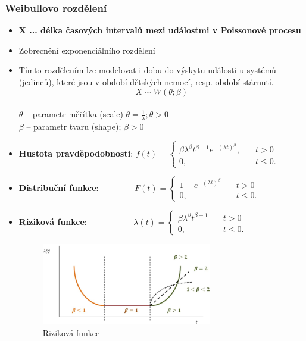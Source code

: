 \subsubsection{Weibullovo rozdělení}
\begin{itemize}
	\item \textbf{X ... délka časových intervalů mezi událostmi v Poissonově procesu}
	\item Zobrecnění exponenciálního rozdělení
	\item Tímto rozdělením lze modelovat i dobu do výskytu události u systémů (jedinců), které jsou v období dětských nemocí, resp. období stárnutí.
	$$X \sim W(\theta;\beta)$$
	\\ $\theta$ -- parametr měřítka (scale) $\theta = \frac{1}{\lambda}; \theta > 0$ \\ $\beta$ -- parametr tvaru (shape); $\beta > 0$
	\item \textbf{Hustota pravděpodobnosti}:
	 $f(t) =	\begin{cases}
 			   \beta\lambda^{\beta} t^{\beta-1}e^{-(\lambda t)^{\beta}},       & \quad t > 0\\
 			   0,  & \quad t \leq 0.
 			 \end{cases}$
	\item \textbf{Distribuční funkce}:
	$\qquad\qquad F(t) =	\begin{cases}
 			   1 -  e^{-(\lambda t)^{\beta} }      & \quad t > 0\\
 			   0,  & \quad t \leq 0.
 			 \end{cases}$
 	\item \textbf{Riziková funkce}:
	$\qquad\qquad\quad\; \lambda(t) =	\begin{cases}
 			   \beta\lambda^\beta t^{\beta-1}      & \quad t > 0\\
 			   0,  & \quad t \leq 0.
 			 \end{cases}$
 	\begin{figure}[H]
	\centering
	\includegraphics[width=0.7\textwidth]{assets/12_weib_riz_fce}
	\caption{Riziková funkce}
	\end{figure}
\end{itemize}
